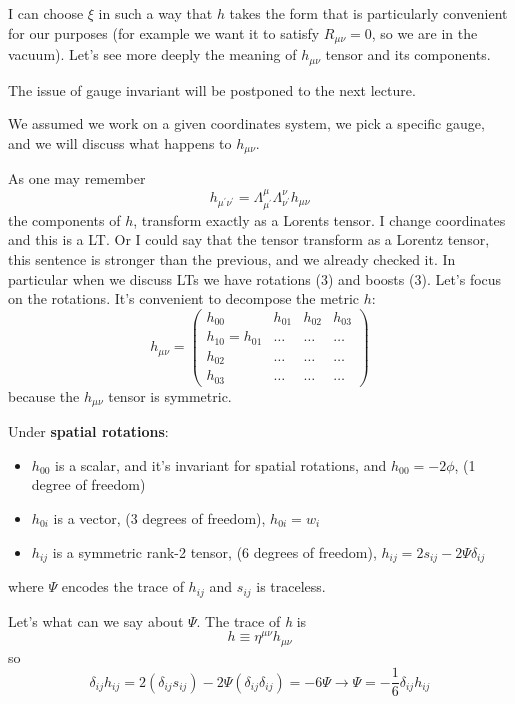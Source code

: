 I can choose $\xi $ in such a way that $h$ takes the form that is particularly convenient for our purposes (for example we want it to satisfy $R_{\mu \nu } = 0 $, so we are in the vacuum).
Let's see more deeply the meaning of $h_{\mu \nu }$ tensor and its components.\par
The issue of gauge invariant will be postponed to the next lecture.\par
We assumed we work on a given coordinates system, we pick a specific gauge, and we will discuss what happens to $h_{\mu \nu }$.\par
As one may remember
\[
h_{\mu ^{\prime }\nu ^{\prime }} = \Lambda ^{\mu }_{\mu ^{\prime }} \Lambda ^{\nu }_{\nu ^{\prime }}h_{\mu \nu }
\]
the components of $h$, transform exactly as a Lorents tensor. I change coordinates and this is a LT. Or I could say that the tensor transform as a Lorentz tensor, this sentence is stronger than the previous, and we already checked it. In particular when we discuss LTs we have rotations (3) and boosts (3). Let's focus on the rotations. It's convenient to decompose the metric $h$:
\[
h_{\mu \nu } = \begin{pmatrix}
h_{00} & h_{01} & h_{02} & h_{03} \\
h_{10}=h_{01} & \ldots  & \ldots  & \ldots  \\
h_{02} & \ldots  & \ldots  & \ldots  \\
h_{03} & \ldots  & \ldots  & \ldots 
\end{pmatrix} 
\]
because the $h_{\mu \nu }$ tensor is symmetric.\par
Under \textbf{spatial rotations}:
\begin{itemize}
\item $h_{00}$ is a scalar, and it's invariant for spatial rotations, and $h_{00} = -2\phi $, (1 degree of freedom)
\item $h_{0i}$ is a vector, (3 degrees of freedom), $h_{0i} = w_{i}$
\item $h_{ij}$ is a symmetric rank-2 tensor, (6 degrees of freedom), $h_{ij} = 2s_{ij} -2\Psi \delta _{ij}$
\end{itemize}
where $\Psi $ encodes the trace of $h_{ij}$ and $s_{ij}$ is traceless.\par
Let's what can we say about $\Psi $. The trace of \emph{h} is 
\[
h \equiv \eta ^{\mu \nu } h_{\mu \nu }
\]
so 
\begin{equation}
	\delta _{ij}h_{ij} = 2\left( \delta _{ij}s_{ij} \right)-2\Psi \left( \delta _{ij}\delta _{ij} \right) = -6\Psi \to \Psi = -\frac{1}{6}\delta _{ij}h_{ij}
\end{equation}
